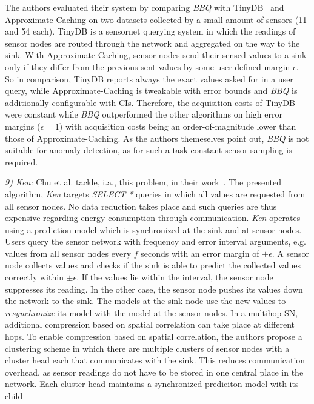 The authors evaluated their system by comparing \textit{BBQ} with
TinyDB~\cite{madden2005tinydb} and Approximate-Caching on two datasets
collected by a small amount of sensors (11 and 54 each). TinyDB is a sensornet
querying system in which the readings of sensor nodes are routed through the
network and aggregated on the way to the sink. With Approximate-Caching, sensor
nodes send their sensed values to a sink only if they differ from the previous
sent values by some user defined margin $ \epsilon $. So in comparison, TinyDB
reports always the exact values asked for in a user query, while
Approximate-Caching is tweakable with error bounds and \textit{BBQ} is
additionally configurable with \acp{CI}. Therefore, the acquisition costs of
TinyDB were constant while \textit{BBQ} outperformed the other algorithms on
high error margins ($ \epsilon = 1 $) with acquisition costs being an
order-of-magnitude lower than those of Approximate-Caching. As the authors
themeselves point out, \textit{BBQ} is not suitable for anomaly detection, as
for such a task constant sensor sampling is required.
\par
\textit{9) Ken:}
Chu et al. tackle, i.a., this problem, in their work~\cite{chu2006approximate}.
The presented algorithm, \textit{Ken} targets \textit{SELECT *} queries in
which all values are requested from all sensor nodes. No data reduction takes
place and such queries are thus expensive regarding energy consumption through
communication. \textit{Ken} operates using a prediction model which is
synchronized at the sink and at sensor nodes. Users query the sensor network
with frequency and error interval arguments, e.g. values from all sensor nodes
every $ f $ seconds with an error margin of $ \pm\epsilon $. A sensor node
collects values and checks if the sink is able to predict the collected
values correctly within $ \pm\epsilon $. If the values lie within the interval,
the sensor node suppresses its reading. In the other case, the sensor node
pushes its values down the network to the sink. The models at the sink
node use the new values to \textit{resynchronize} its model with the model at
the sensor nodes. In a multihop \ac{SN}, additional compression based on
spatial correlation can take place at different hops. To enable compression
based on spatial correlation, the authors propose a clustering scheme in which
there are multiple clusters of sensor nodes with a cluster head each that
communicates with the sink. This reduces communication overhead, as
sensor readings do not have to be stored in one central place in the network.
Each cluster head maintains a synchronized prediciton model with its child
